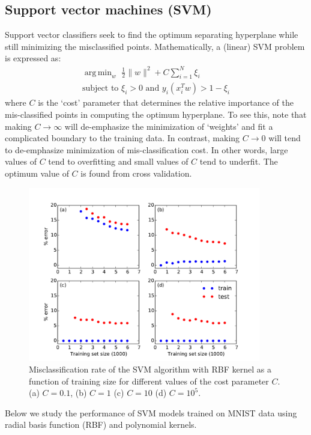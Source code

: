 \documentclass[10pt,letterpaper]{article}
\DeclareMathOperator*{\argmin}{arg\,min}
\begin{document}
%
\subsection{Support vector machines (SVM)}
Support vector classifiers seek to find the optimum separating hyperplane while still minimizing the misclassified points. Mathematically, a (linear) SVM problem is expressed as:
\begin{align}
	\argmin_{w}\,\, \frac{1}{2}\|w\|^2 + C \sum_{i=1}^N\xi_i  \nonumber \\
	\text{subject to } \xi_i > 0 \text{ and } y_i(x_i^Tw) > 1-\xi_i \label{svmeq}
\end{align}
where $C$ is the `cost' parameter that determines the relative importance of the mis-classified points in computing the optimum hyperplane. To see this, note that making $C\to\infty$ will de-emphasize the minimization of `weights' and fit a complicated boundary to the training data. In contrast, making $C\to 0$ will tend to de-emphasize minimization of mis-classification cost. In other words, large values of $C$ tend to overfitting and small values of $C$ tend to underfit. The optimum value of $C$ is found from cross validation. 
\begin{figure}[tbp]
	\begin{center}
	\includegraphics[width=4in]{../results/mnist/svm/error_vs_training_size.pdf}
	\end{center}
	\caption{Misclassification rate of the SVM algorithm with RBF kernel as a function of training size for different values of the cost parameter $C$. (a) $C=0.1$, (b) $C=1$ (c) $C=10$ (d) $C=10^5$.\label{svm1}}
\end{figure}

Below we study the performance of SVM models trained on MNIST data using radial basis function (RBF) and polynomial kernels. 
\end{document}

